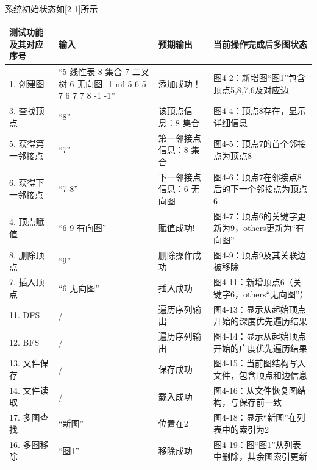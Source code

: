 \documentclass[supercite]{Experimental_Report}
\theoremstyle{definition}
\begin{document}
系统初始状态如\ref*{2-1}所示

\begin{center}
        \setlength{\tabcolsep}{2.0mm}
        \label{table:multi-seqlist-test}
        \begin{tabularx}{\textwidth}{|l|X|X|X|}
            \hline
            \textbf{测试功能及其对应序号} & \textbf{输入} & \textbf{预期输出} & \textbf{当前操作完成后多图状态} \\
            \hline
            1. 创建图 & “5 线性表 8 集合 7 二叉树 6 无向图 -1 nil 5 6 5 7 6 7 7 8 -1 -1” & 添加成功！ & 图4-2：新增图“图1”包含顶点5,8,7,6及对应边 \\
            \hline
            3. 查找顶点 & “8” & 该顶点信息：8 集合 & 图4-4：顶点8存在，显示详细信息 \\
            \hline
            5. 获得第一邻接点 & “7” & 第一邻接点信息：8 集合 & 图4-5：顶点7的首个邻接点为顶点8 \\
            \hline
            6. 获得下一邻接点 & “7 8” & 下一邻接点信息：6 无向图 & 图4-6：顶点7在邻接点8后的下一个邻接点为顶点6 \\
            \hline
            4. 顶点赋值 & “6 9 有向图” & 赋值成功! & 图4-7：顶点6的关键字更新为9，others更新为“有向图” \\
            \hline
            8. 删除顶点 & “9” & 删除操作成功 & 图4-9：顶点9及其关联边被移除 \\
            \hline
            7. 插入顶点 & “6 无向图” & 插入成功 & 图4-11：新增顶点6（关键字6，others“无向图”） \\
            \hline
            11. DFS & / & 遍历序列输出 & 图4-13：显示从起始顶点开始的深度优先遍历结果 \\
            \hline
            12. BFS & / & 遍历序列输出 & 图4-14：显示从起始顶点开始的广度优先遍历结果 \\
            \hline
            13. 文件保存 & / & 保存成功 & 图4-15：当前图结构写入文件，包含顶点和边信息 \\
            \hline
            14. 文件读取 & / & 载入成功 & 图4-16：从文件恢复图结构，与保存前一致 \\
            \hline
            17. 多图查找 & “新图” & 位置在2 & 图4-18：显示“新图”在列表中的索引为2 \\
            \hline
            16. 多图移除 & “图1” & 移除成功 & 图4-19：图“图1”从列表中删除，其余图索引更新 \\
            \hline
        \end{tabularx}
\end{center}
\end{document}
